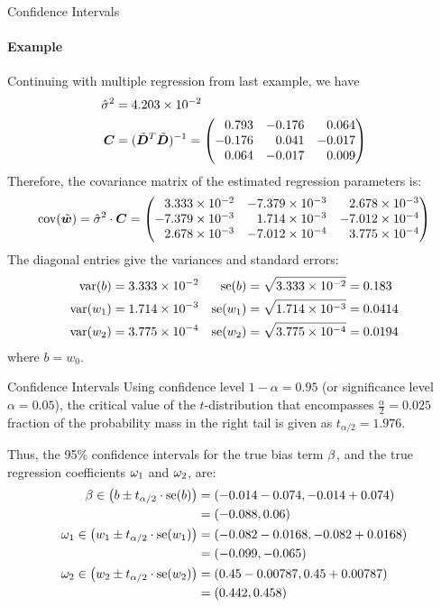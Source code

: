 \begin{frame}{Confidence Intervals}
\framesubtitle{Example}
    Continuing with multiple regression from last example,
we have
    \begin{align*}
        \hsigma^2 & = 4.203 \times 10^{-2}\\
        \bC & = (\abD^T\abD)^{-1} = 
        \amatr{r}{
        0.793 & -0.176 & 0.064\\
        -0.176 &  0.041 & -0.017\\
        0.064 & -0.017 &  0.009}
    \end{align*}
    Therefore, the covariance matrix of the estimated regression
    parameters is:
    \begin{align*}
        \ocov(\abw) = \hsigma^2 \cdot \bC =
        \amatr{r}{
            3.333 \times 10^{-2} & -7.379 \times 10^{-3} & 2.678\times 10^{-3}\\
            -7.379 \times 10^{-3} & 1.714 \times 10^{-3} & -7.012\times
            10^{-4}\\
            2.678 \times 10^{-3} & -7.012 \times 10^{-4} & 3.775\times
        10^{-4}}
    \end{align*}
    The diagonal entries give the variances and standard errors:
    \begin{align*}
        \operatorname{var}(b) & = 3.333 \times 10^{-2} & 
        \operatorname{se}(b) & = \sqrt{3.333 \times 10^{-2}} = 0.183\\
        \operatorname{var}(w_1) & = 1.714 \times 10^{-3} & 
        \operatorname{se}(w_1) & = \sqrt{1.714 \times 10^{-3}} = 0.0414\\
        \operatorname{var}(w_2) & = 3.775 \times 10^{-4} &
        \operatorname{se}(w_2) & = \sqrt{3.775 \times 10^{-4}} = 0.0194
    \end{align*}
    where $b = w_0$.
\end{frame}
\begin{frame}{Confidence Intervals}
%
    Using confidence level $1-\alpha=0.95$ (or significance level
    $\alpha=0.05$), the critical value of the $t$-distribution that
    encompasses $\tfrac{\alpha}{2}=0.025$ 
    fraction of the probability mass in
    the right tail is given as
    $t_{\alpha/2} = 1.976$.

	\medskip

    Thus, the 95\% confidence intervals for the true bias term $\beta$, and
    the true regression coefficients $\omega_1$ and $\omega_2$, are:
    \begin{align*}
        \beta \in \left(b \pm t_{\alpha/2} \cdot \operatorname{se}(b)\right)
         & = \left( -0.014-0.074, -0.014+0.074 \right)\\
         & = (-0.088,0.06)\\
        \omega_1 \in \left(w_1 \pm t_{\alpha/2} \cdot \operatorname{se}(w_1)\right)
        & = \left( -0.082-0.0168, -0.082+0.0168 \right)\\
        & = (-0.099,-0.065)\\
        \omega_2 \in \left(w_2 \pm t_{\alpha/2} \cdot \operatorname{se}(w_2)\right)
         & = \left( 0.45-0.00787, 0.45+0.00787 \right)\\
         & = (0.442,0.458)
    \end{align*}
\end{frame}
